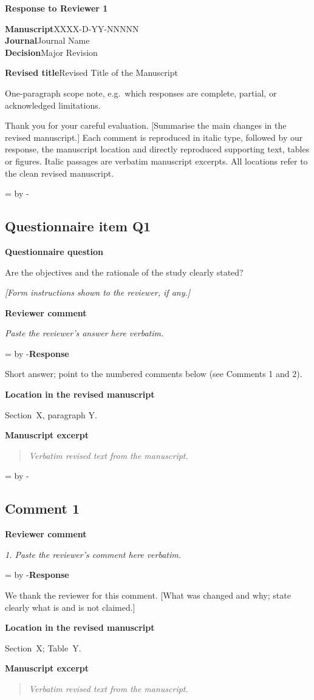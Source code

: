 \documentclass[11pt]{article}
\newenvironment{mdframed}[1][]{\par\medskip\begin{lrbox}{\responseframe}\begin{minipage}{\dimexpr\linewidth-2\fboxsep-2\fboxrule\relax}}{\end{minipage}\end{lrbox}\noindent\fbox{\usebox{\responseframe}}\par\medskip}
\newcommand{\Needspace}[1]{\par\begingroup\dimen0=\pagegoal\advance\dimen0 by -\pagetotal\ifdim\dimen0<#1\newpage\fi\endgroup}
\newcommand{\ReviewerComment}[1]{\par\textbf{Reviewer comment}\par{\itshape #1\par}}
\newcommand{\AuthorResponse}[1]{\par\Needspace{4\baselineskip}\textbf{Response}\par\nobreak #1\par}
\newcommand{\RevisedExcerpt}[1]{\begin{quote}\itshape #1\end{quote}}
\newcommand{\EvidenceBox}[2]{\begin{mdframed}\small\textbf{#1}\par\medskip #2\end{mdframed}}
\begin{document}
\begin{center}\Large\bfseries Response to Reviewer 1\end{center}
\textbf{Manuscript}\quad XXXX-D-YY-NNNNN\\
\textbf{Journal}\quad Journal Name\\
\textbf{Decision}\quad Major Revision

\textbf{Revised title}\quad Revised Title of the Manuscript

\begin{mdframed}\small One-paragraph scope note, e.g.\ which responses are complete, partial, or acknowledged limitations.\end{mdframed}

Thank you for your careful evaluation. [Summarise the main changes in the revised manuscript.] Each comment is reproduced in italic type, followed by our response, the manuscript location and directly reproduced supporting text, tables or figures. Italic passages are verbatim manuscript excerpts. All locations refer to the clean revised manuscript.

\Needspace{5\baselineskip}
\subsection*{Questionnaire item Q1}
\par\textbf{Questionnaire question}\par Are the objectives and the rationale of the study clearly stated?
\par{\small\textit{[Form instructions shown to the reviewer, if any.]}}\par
\ReviewerComment{Paste the reviewer's answer here verbatim.}
\AuthorResponse{Short answer; point to the numbered comments below (see Comments 1 and 2).}
\EvidenceBox{Location in the revised manuscript}{Section~X, paragraph Y.\par\smallskip\textbf{Manuscript excerpt}\RevisedExcerpt{Verbatim revised text from the manuscript.}}

\Needspace{5\baselineskip}
\subsection*{Comment 1}
\ReviewerComment{1. Paste the reviewer's comment here verbatim.}
\AuthorResponse{We thank the reviewer for this comment. [What was changed and why; state clearly what is and is not claimed.]}
\EvidenceBox{Location in the revised manuscript}{Section~X; Table~Y.\par\smallskip\textbf{Manuscript excerpt}\RevisedExcerpt{Verbatim revised text from the manuscript.}}
\end{document}
